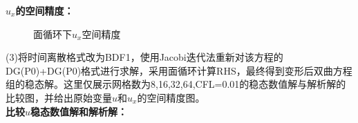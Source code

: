 \documentclass[a4paper,11pt,UTF8]{article}%
\theoremstyle{plain}
\begin{document}
	\indent \textbf{$u_x$的空间精度：}
\begin{figure}[!h]
	\centering

	
	\caption{面循环下$u_x$空间精度}
\end{figure}
\newpage
\indent(3)将时间离散格式改为BDF1，使用Jacobi迭代法重新对该方程的DG(P0)+DG(P0)格式进行求解，采用面循环计算RHS，最终得到变形后双曲方程组的稳态解。这里仅展示网格数为8,16,32,64,CFL=0.01的稳态数值解与解析解的比较图，并给出原始变量$u$和$u_x$的空间精度图。\\
\indent \textbf{比较$u$稳态数值解和解析解：}
\end{document}
